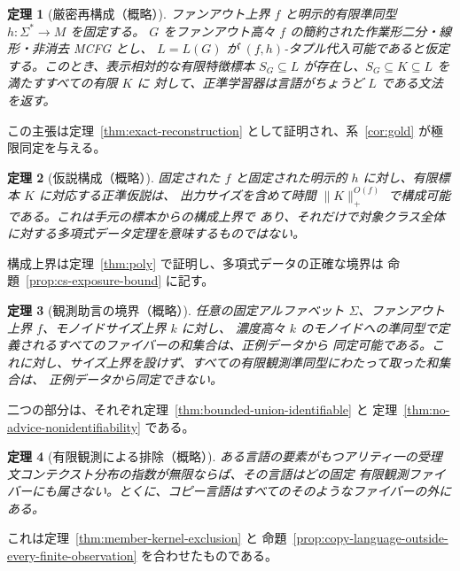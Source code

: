 \documentclass[11pt,a4paper]{ltjsarticle}
\newtheorem{theorem}{定理}[section]
\theoremstyle{remark}
\begin{document}
\begin{theorem}[厳密再構成（概略）]
\label{thm:main-exact-preview}
ファンアウト上界 \(f\) と明示的有限準同型 \(h:\Sigma^*\to M\) を固定する。
\(G\) をファンアウト高々 \(f\) の簡約された作業形二分・線形・非消去 MCFG とし、
\(L=L(G)\) が \((f,h)\)-タプル代入可能であると仮定する。このとき、表示相対的な有限特徴標本
\(S_G\subseteq L\) が存在し、\(S_G\subseteq K\subseteq L\) を満たすすべての有限 \(K\) に
対して、正準学習器は言語がちょうど \(L\) である文法を返す。
\end{theorem}

この主張は定理~\ref{thm:exact-reconstruction} として証明され、系~\ref{cor:gold} が極限同定を与える。

\begin{theorem}[仮説構成（概略）]
\label{thm:main-poly-preview}
固定された \(f\) と固定された明示的 \(h\) に対し、有限標本 \(K\) に対応する正準仮説は、
出力サイズを含めて時間 \(\|K\|_+^{O(f)}\) で構成可能である。これは手元の標本からの構成上界で
あり、それだけで対象クラス全体に対する多項式データ定理を意味するものではない。
\end{theorem}

構成上界は定理~\ref{thm:poly} で証明し、多項式データの正確な境界は
命題~\ref{prop:cs-exposure-bound} に記す。

\begin{theorem}[観測助言の境界（概略）]
\label{thm:main-advice-preview}
任意の固定アルファベット \(\Sigma\)、ファンアウト上界 \(f\)、モノイドサイズ上界 \(k\) に対し、
濃度高々 \(k\) のモノイドへの準同型で定義されるすべてのファイバーの和集合は、正例データから
同定可能である。これに対し、サイズ上界を設けず、すべての有限観測準同型にわたって取った和集合は、
正例データから同定できない。
\end{theorem}

二つの部分は、それぞれ定理~\ref{thm:bounded-union-identifiable} と
定理~\ref{thm:no-advice-nonidentifiability} である。

\begin{theorem}[有限観測による排除（概略）]
\label{thm:main-exclusion-preview}
ある言語の要素がもつアリティ一の受理文コンテクスト分布の指数が無限ならば、その言語はどの固定
有限観測ファイバーにも属さない。とくに、コピー言語はすべてのそのようなファイバーの外にある。
\end{theorem}

これは定理~\ref{thm:member-kernel-exclusion} と
命題~\ref{prop:copy-language-outside-every-finite-observation} を合わせたものである。
\end{document}
